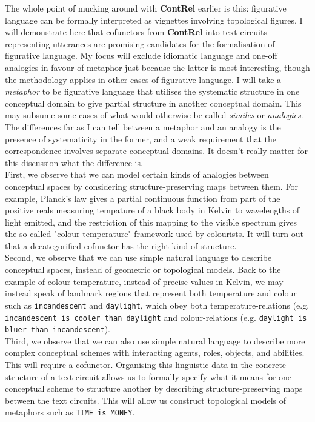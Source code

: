 The whole point of mucking around with \textbf{ContRel} earlier is this: figurative language can be formally interpreted as vignettes involving topological figures. I will demonstrate here that cofunctors from \textbf{ContRel} into text-circuits representing utterances are promising candidates for the formalisation of figurative language. My focus will exclude idiomatic language and one-off analogies in favour of metaphor just because the latter is most interesting, though the methodology applies in other cases of figurative language. I will take a \emph{metaphor} to be figurative language that utilises the systematic structure in one conceptual domain to give partial structure in another conceptual domain. This may subsume some cases of what would otherwise be called \emph{similes} or \emph{analogies}. The differences far as I can tell between a metaphor and an analogy is the presence of systematicity in the former, and a weak requirement that the correspondence involves separate conceptual domains. It doesn't really matter for this discussion what the difference is.\\

First, we observe that we can model certain kinds of analogies between conceptual spaces by considering structure-preserving maps between them. For example, Planck's law gives a partial continuous function from part of the positive reals measuring tempature of a black body in Kelvin to wavelengths of light emitted, and the restriction of this mapping to the visible spectrum gives the so-called "colour temperature" framework used by colourists. It will turn out that a decategorified cofunctor has the right kind of structure.\\

Second, we observe that we can use simple natural language to describe conceptual spaces, instead of geometric or topological models. Back to the example of colour temperature, instead of precise values in Kelvin, we may instead speak of landmark regions that represent both temperature and colour such as \texttt{incandescent} and \texttt{daylight}, which obey both temperature-relations (e.g. \texttt{incandescent is cooler than daylight} and colour-relations (e.g. \texttt{daylight is bluer than incandescent}).\\

Third, we observe that we can also use simple natural language to describe more complex conceptual schemes with interacting agents, roles, objects, and abilities. This will require a cofunctor. Organising this linguistic data in the concrete structure of a text circuit allows us to formally specify what it means for one conceptual scheme to structure another by describing structure-preserving maps between the text circuits. This will allow us construct topological models of metaphors such as \texttt{TIME is MONEY}.

